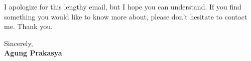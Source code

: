 \documentclass[12pt]{res} %
\begin{document}
I apologize for this lengthy email, but I hope you can understand. If you find something you
would like to know more about, please don’t hesitate to contact me. Thank you.

Sincerely,\\
\textbf{Agung Prakasya}


\pagebreak



\address{\textbf{{\scriptsize email}}. \href{mailto:aprksy@gmail.com}{aprksy@gmail.com}; 
\textbf{{\scriptsize phone}}. \href{https://wa.me/628197519750}{+62 8-1975-1975-0};\\ 
\textbf{{\scriptsize linkedIn}}. \href{https://www.linkedin.com/in/agungprakasya/}{linkedin.com/in/agungprakasya/}\\ 
\textbf{{\scriptsize github}}. \href{https://github.com/aprksy}{github.com/aprksy}}
\end{document}
